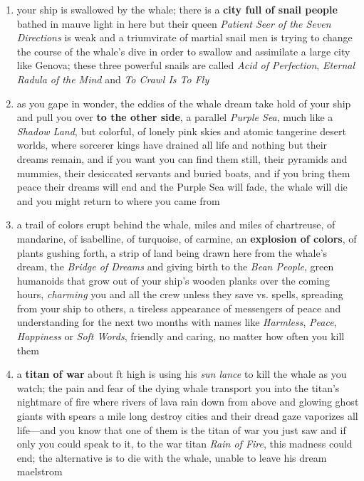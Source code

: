 \documentclass[a4paper,serif]{rpg-module}
\begin{document}
\begin{enumerate}
\item your ship is swallowed by the whale; there is a \textbf{city
  full of snail people} bathed in mauve light in here but their queen
  \textit{Patient Seer of the Seven Directions} is weak and a
  triumvirate of martial snail men is trying to change the course of
  the whale's dive in order to swallow and assimilate a large city
  like Genova; these three powerful snails are called \textit{Acid of
    Perfection}, \textit{Eternal Radula of the Mind} and \textit{To
    Crawl Is To Fly}

\item as you gape in wonder, the eddies of the whale dream take hold
  of your ship and pull you over \textbf{to the other side}, a
  parallel \textit{Purple Sea}, much like a \textit{Shadow Land}, but
  colorful, of lonely pink skies and atomic tangerine desert worlds,
  where sorcerer kings have drained all life and nothing but their
  dreams remain, and if you want you can find them still, their
  pyramids and mummies, their desiccated servants and buried boats,
  and if you bring them peace their dreams will end and the Purple Sea
  will fade, the whale will die and you might return to where you came
  from

\item a trail of colors erupt behind the whale, miles and miles of
  chartreuse, of mandarine, of isabelline, of turquoise, of carmine,
  an \textbf{explosion of colors}, of plants gushing forth, a strip of
  land being drawn here from the whale's dream, the \textit{Bridge of
    Dreams} and giving birth to the \textit{Bean People}, green
  humanoids that grow out of your ship's wooden planks over the coming
  hours, \textit{charming} you and all the crew unless they save vs.
  spells, spreading from your ship to others, a tireless appearance of
  messengers of peace and understanding for the next two months with
  names like \textit{Harmless}, \textit{Peace}, \textit{Happiness} or
  \textit{Soft Words}, friendly and caring, no matter how often you
  kill them

\item a \textbf{titan of war} about \unit[200]{ft} high is using his
  \textit{sun lance} to kill the whale as you watch; the pain and fear
  of the dying whale transport you into the titan's nightmare of fire
  where rivers of lava rain down from above and glowing ghost giants
  with spears a mile long destroy cities and their dread gaze
  vaporizes all life—and you know that one of them is the titan of war
  you just saw and if only you could speak to it, to the war titan
  \textit{Rain of Fire}, this madness could end; the alternative is to
  die with the whale, unable to leave his dream maelstrom


\end{enumerate}
\end{document}
